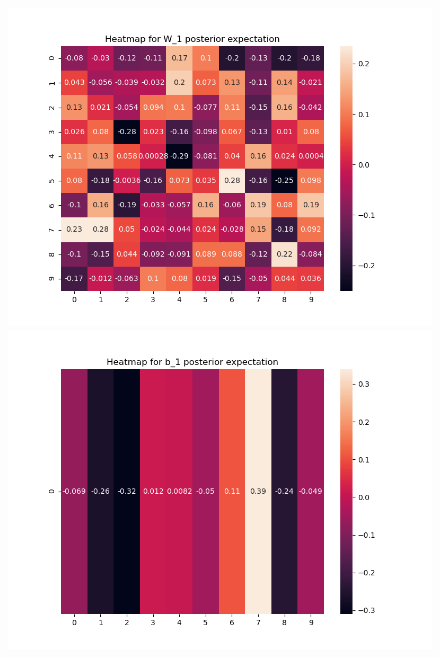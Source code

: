 \documentclass[10pt]{homeworg}
\begin{document}
\begin{figure}[!htbp]
    \centering
    \begin{minipage}{0.45\textwidth}
        \centering
       \includegraphics[scale=0.5]{figures/heatmap_exp_W_1.png}
    \end{minipage}\hfill
    \begin{minipage}{0.45\textwidth}
        \centering
        \includegraphics[scale=0.5]{figures/heatmap_exp_b_1.png}
    \end{minipage}
\end{figure}

\newpage
\end{document}
